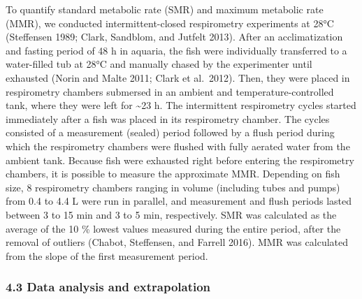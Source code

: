 \documentclass[12pt,a4paper]{article}
\begin{document}
To quantify standard metabolic rate (SMR) and maximum metabolic rate
(MMR), we conducted intermittent-closed respirometry experiments at 28°C
(Steffensen 1989; Clark, Sandblom, and Jutfelt 2013). After an
acclimatization and fasting period of 48 h in aquaria, the fish were
individually transferred to a water-filled tub at 28°C and manually
chased by the experimenter until exhausted (Norin and Malte 2011; Clark
et al.~2012). Then, they were placed in respirometry chambers submersed
in an ambient and temperature-controlled tank, where they were left for
\textasciitilde{}23 h. The intermittent respirometry cycles started
immediately after a fish was placed in its respirometry chamber. The
cycles consisted of a measurement (sealed) period followed by a flush
period during which the respirometry chambers were flushed with fully
aerated water from the ambient tank. Because fish were exhausted right
before entering the respirometry chambers, it is possible to measure the
approximate MMR. Depending on fish size, 8 respirometry chambers ranging
in volume (including tubes and pumps) from 0.4 to 4.4 L were run in
parallel, and measurement and flush periods lasted between 3 to 15 min
and 3 to 5 min, respectively. SMR was calculated as the average of the
10 \% lowest values measured during the entire period, after the removal
of outliers (Chabot, Steffensen, and Farrell 2016). MMR was calculated
from the slope of the first measurement period.

\hypertarget{data-analysis-and-extrapolation-3}{%
\subsubsection{4.3 Data analysis and
extrapolation}\label{data-analysis-and-extrapolation-3}}
\end{document}
